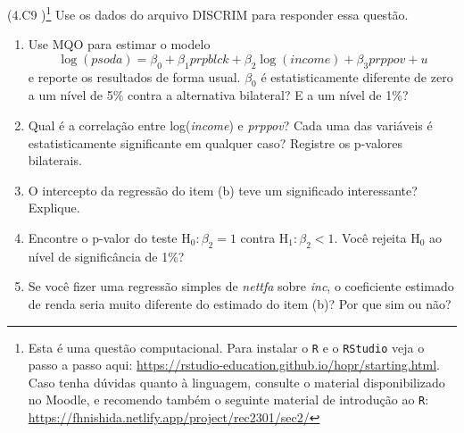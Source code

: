 \documentclass[12pt,letterpaper, onecolumn]{exam}
\begin{document}
\begin{questions}
\question\qstar (4.C9 \citep{wooldridge2016})\footnote{Esta é uma questão computacional. Para instalar o \texttt{R} e o \texttt{RStudio} veja o passo a passo aqui: \href{https://rstudio-education.github.io/hopr/starting.html}{https://rstudio-education.github.io/hopr/starting.html}. Caso tenha dúvidas quanto à linguagem, consulte o material disponibilizado no Moodle, e recomendo também o seguinte material de introdução ao \texttt{R}: \href{https://fhnishida.netlify.app/project/rec2301/sec2/}{https://fhnishida.netlify.app/project/rec2301/sec2/} }
Use os dados do arquivo DISCRIM para responder essa questão.
    \begin{enumerate} [label = (\alph*)]
\item Use MQO para estimar o modelo\begin{equation*}
    \log(psoda) = \beta_0 + \beta_1prpblck + \beta_2\log(income) + \beta_3 prppov + u
\end{equation*} e reporte os resultados de forma usual. $\beta_0$ é estatisticamente diferente de zero a um nível de 5\% contra a alternativa bilateral? E a um nível de 1\%?
\item Qual é a correlação entre log(\textit{income}) e \textit{prppov}? Cada uma das variáveis é estatisticamente significante em qualquer caso? Registre os p-valores bilaterais.
\item O intercepto da regressão do item (b) teve um significado interessante? Explique.
\item Encontre o p-valor do teste $\text{H}_0: \beta_2 =1$ contra $\text{H}_1: \beta_2 <1$. Você rejeita  $\text{H}_0$ ao nível de significância de 1\%?
\item Se você fizer uma regressão simples de \textit{nettfa} sobre \textit{inc}, o coeficiente estimado de renda seria muito diferente do estimado do item (b)? Por que sim ou não?
    \end{enumerate}
    
\end{questions}
\newpage

\end{document}
